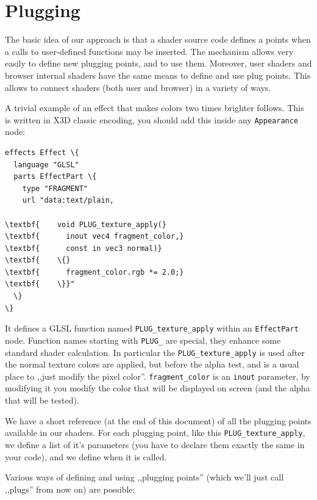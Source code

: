 \documentclass{acmsiggraph}                     %
\begin{document}
\section{Plugging}

The basic idea of our approach is that a shader source code defines
a points when a calls to user-defined functions may be inserted. The mechanism
allows very easily to define new plugging points, and to use
them. Moreover, user shaders and browser internal shaders have the
same means to define and use plug points. This allows to connect
shaders (both user and browser) in a variety of ways.

A trivial example of an effect that makes colors two times brighter
follows. This is written in X3D classic encoding,
you should add this inside any \texttt{Appearance} node:

\begin{Verbatim}[commandchars=\\\{\},frame=single]
effects Effect \{
  language "GLSL"
  parts EffectPart \{
    type "FRAGMENT"
    url "data:text/plain,

\textbf{    void PLUG_texture_apply(}
\textbf{      inout vec4 fragment_color,}
\textbf{      const in vec3 normal)}
\textbf{    \{}
\textbf{      fragment_color.rgb *= 2.0;}
\textbf{    \}}"
  \}
\}
\end{Verbatim}

It defines a GLSL function named \texttt{PLUG\_texture\_apply}
within an \texttt{EffectPart} node. Function names starting with \texttt{PLUG\_}
are special, they enhance some standard shader calculation. In particular
the \texttt{PLUG\_texture\_apply} is used after the normal texture colors are applied,
but before the alpha test, and is a usual place to ,,just modify the pixel color''.
\texttt{fragment\_color} is an \texttt{inout} parameter, by modifying it
you modify the color that will be displayed on screen (and the alpha that will
be tested).

We have a short reference (at the end of this document) of all
the plugging points available in our shaders. For each plugging point,
like this \texttt{PLUG\_texture\_apply}, we define a list of it's parameters
(you have to declare them exactly the same in your code), and we define
when it is called.

Various ways of defining and using ,,plugging points'' (which we'll just call
,,plugs'' from now on) are possible:
\end{document}
